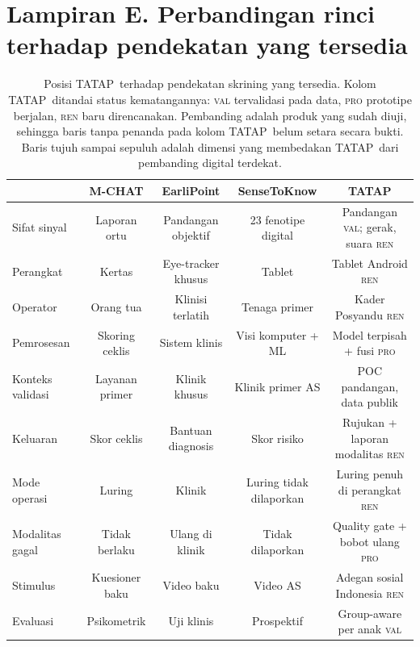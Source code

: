 \documentclass[10pt,letterpaper]{article}
\newcommand{\produk}{TATAP}
\begin{document}
\section*{Lampiran E. Perbandingan rinci terhadap pendekatan yang tersedia}

\begin{table}[H]
\centering
\scriptsize
\caption{Posisi \produk\ terhadap pendekatan skrining yang tersedia. Kolom \produk\ ditandai
status kematangannya: \textsc{val} tervalidasi pada data, \textsc{pro} prototipe berjalan,
\textsc{ren} baru direncanakan. Pembanding adalah produk yang sudah diuji, sehingga baris
tanpa penanda pada kolom \produk\ belum setara secara bukti. Baris tujuh sampai sepuluh
adalah dimensi yang membedakan \produk\ dari pembanding digital terdekat.}
\label{tab:gap}
\begin{tabular}{@{}lcccc@{}}
\toprule
 & \textbf{M-CHAT} & \textbf{EarliPoint} & \textbf{SenseToKnow} & \textbf{\produk} \\
\midrule
Sifat sinyal            & Laporan ortu & Pandangan objektif & 23 fenotipe digital & Pandangan \textsc{val}; gerak, suara \textsc{ren} \\
Perangkat               & Kertas & Eye-tracker khusus & Tablet & Tablet Android \textsc{ren} \\
Operator                & Orang tua & Klinisi terlatih & Tenaga primer & Kader Posyandu \textsc{ren} \\
Pemrosesan              & Skoring ceklis & Sistem klinis & Visi komputer + ML & Model terpisah + fusi \textsc{pro} \\
Konteks validasi        & Layanan primer & Klinik khusus & Klinik primer AS & POC pandangan, data publik \\
Keluaran                & Skor ceklis & Bantuan diagnosis & Skor risiko & Rujukan + laporan modalitas \textsc{ren} \\
Mode operasi            & Luring & Klinik & Luring tidak dilaporkan & Luring penuh di perangkat \textsc{ren} \\
Modalitas gagal         & Tidak berlaku & Ulang di klinik & Tidak dilaporkan & Quality gate + bobot ulang \textsc{pro} \\
Stimulus                & Kuesioner baku & Video baku & Video AS & Adegan sosial Indonesia \textsc{ren} \\
Evaluasi                & Psikometrik & Uji klinis & Prospektif & Group-aware per anak \textsc{val} \\
\bottomrule
\end{tabular}
\end{table}
\end{document}
